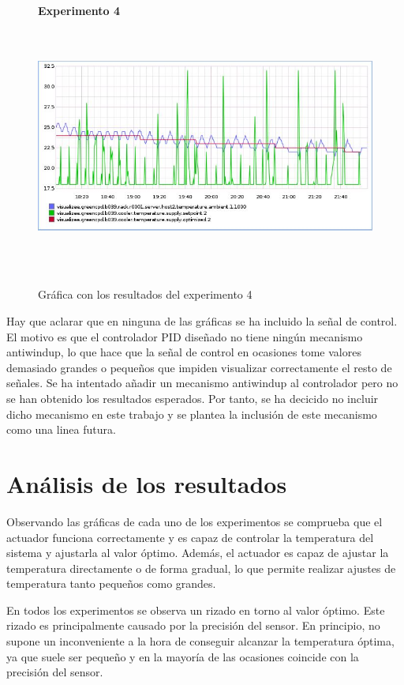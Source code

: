 \begin{figure}[h]
\centering
\textbf{Experimento 4}\\
\includegraphics[width=120mm,height=85mm]{imagenes/capitulo6/experimento4}
\caption {Gráfica con los resultados del experimento 4}
\label{fig6_4:experimento4}
\end{figure}

	Hay que aclarar que en ninguna de las gráficas se ha incluido la señal de control. El motivo es que el controlador PID diseñado no tiene ningún mecanismo antiwindup, lo que hace que la señal de control en ocasiones tome valores demasiado grandes o pequeños que impiden visualizar correctamente el resto de señales. Se ha intentado añadir un mecanismo antiwindup al controlador pero no se han obtenido los resultados esperados. Por tanto, se ha decicido no incluir dicho mecanismo en este trabajo y se plantea la inclusión de este mecanismo como una linea futura. 

\section{Análisis de los resultados}\label{sec:análisis}
	Observando las gráficas de cada uno de los experimentos se comprueba que el actuador funciona correctamente y es capaz de controlar la temperatura del sistema y ajustarla al valor óptimo. Además, el actuador es capaz de ajustar la temperatura directamente o de forma gradual, lo que permite realizar ajustes de temperatura tanto pequeños como grandes. 

	 En todos los experimentos se observa un rizado en torno al valor óptimo. Este rizado es principalmente causado por la precisión del sensor. En principio, no supone un inconveniente a la hora de conseguir alcanzar la temperatura óptima, ya que suele ser pequeño y en la mayoría de las ocasiones coincide con la precisión del sensor.

